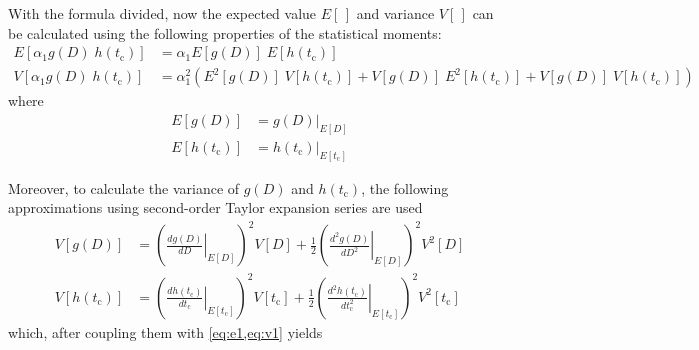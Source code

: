 \documentclass[12pt,number,preprint,review,times]{elsarticle}
\begin{document}
With the formula divided, now the expected value $E[\,]$ and variance $V[\,]$ can be calculated using the following properties of the statistical moments:
\begin{align}
E[\alpha_1 g(D) \; h(t_\mathrm{c})] &= \alpha_1  E[g(D)] \; E[h(t_\mathrm{c})] \label{eq:e1}\\%
V[\alpha_1 g(D) \; h(t_\mathrm{c})] &= \alpha_1^2  ( E^2[g(D)] \; V[h(t_\mathrm{c})] + V[g(D)] \; E^2[h(t_\mathrm{c})] + V[g(D)] \; V[h(t_\mathrm{c})]) \label{eq:v1}
\end{align}
where
\begin{align}
E[g(D)] &= {\left.{g(D)}\right|_{E[D]}} \label{eq:e2}\\
E[h(t_\mathrm{c})] &= \left.{h(t_\mathrm{c})}\right|_{E[t_\mathrm{c}]} \label{eq:e3}
\end{align}

Moreover, to calculate the variance of $g(D)$ and $h(t_\mathrm{c})$, the following approximations using second-order Taylor expansion series are used
\begin{align}
V[g(D)] &= {\left( \left.\frac{d g(D)}{d D}\right|_{E[D]} \right)}^2 V[D] + \frac{1}{2} {\left( \left.\frac{d^2 g(D)}{d D^2}\right|_{E[D]} \right)}^2 V^2[D] \label{eq:v2}\\%
V[h(t_\mathrm{c})] &= {\left( \left.\frac{d h(t_\mathrm{c})}{d t_\mathrm{c}}\right|_{E[t_\mathrm{c}]} \right)}^2 V[t_\mathrm{c}] + \frac{1}{2} {\left( \left.\frac{d^2 h(t_\mathrm{c})}{d t_\mathrm{c}^2}\right|_{E[t_\mathrm{c}]} \right)}^2 V^2[t_\mathrm{c}] \label{eq:v3}
\end{align}
which, after coupling them with \cref{eq:e1,eq:v1} yields
\end{document}
